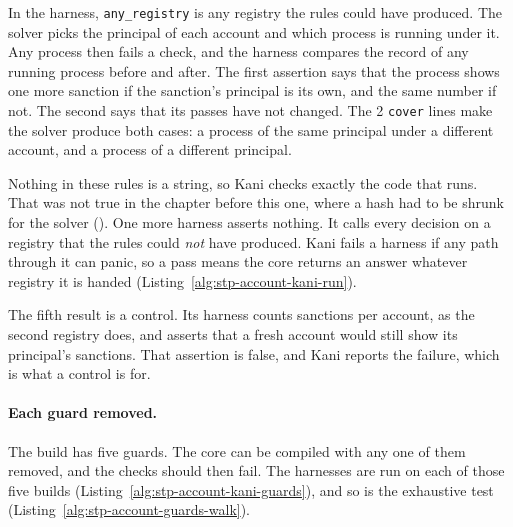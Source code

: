 In the harness, \texttt{any\_registry} is any registry the rules could
have produced. The solver picks the principal of each account and which
process is running under it. Any process then fails a check, and the
harness compares the record of any running process before and after. The
first assertion says that the process shows one more sanction if the
sanction's principal is its own, and the same number if not. The second
says that its passes have not changed. The 2 \texttt{cover} lines make
the solver produce both cases: a process of the same principal under a
different account, and a process of a different principal.

Nothing in these rules is a string, so Kani checks exactly the code that
runs. That was not true in the chapter before this one, where a hash had
to be shrunk for the solver (). One more
harness asserts nothing. It calls every decision on a registry that the
rules could \emph{not} have produced. Kani fails a harness if any path
through it can panic, so a pass means the core returns an answer
whatever registry it is handed
(Listing~\ref{alg:stp-account-kani-run}).


The fifth result is a control. Its harness counts sanctions per account,
as the second registry does, and asserts that a fresh account would
still show its principal's sanctions. That assertion is false, and Kani
reports the failure, which is what a control is for.

\paragraph{Each guard removed.}
The build has five guards. The core can be compiled with any one of them
removed, and the checks should then fail. The harnesses are run on each
of those five builds (Listing~\ref{alg:stp-account-kani-guards}), and so
is the exhaustive test (Listing~\ref{alg:stp-account-guards-walk}).



